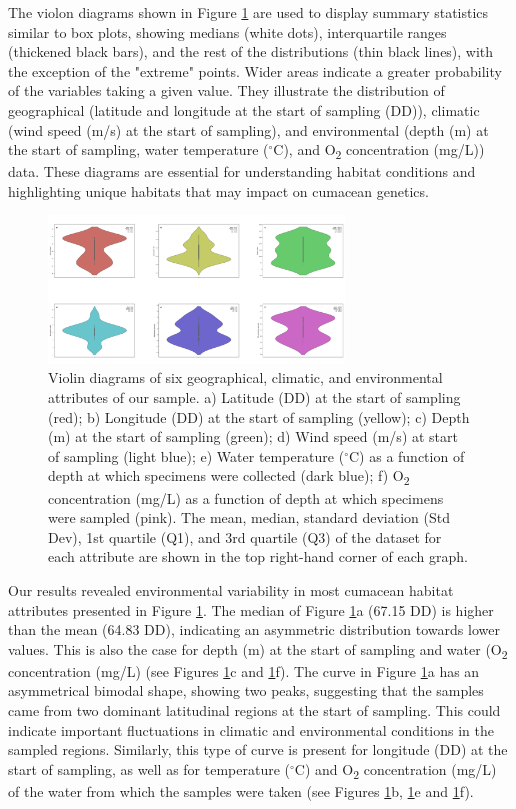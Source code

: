 The violon diagrams shown in Figure \ref{fig:fig2} are used to display summary statistics similar to box plots, showing medians (white dots), interquartile ranges (thickened black bars), and the rest of the distributions (thin black lines), with the exception of the "extreme" points. Wider areas indicate a greater probability of the variables taking a given value. They illustrate the distribution of geographical (latitude and longitude at the start of sampling (DD)), climatic (wind speed (m/s) at the start of sampling), and environmental (depth (m) at the start of sampling, water temperature ($^\circ$C), and O\textsubscript{2} concentration (mg/L)) data. These diagrams are essential for understanding habitat conditions and highlighting unique habitats that may impact on cumacean genetics. 

\begin{figure}[htbp]
    \centering
    \includegraphics[width=0.7\textwidth]{figure1.jpg}
    \caption{Violin diagrams of six geographical, climatic, and environmental attributes of our sample. a) Latitude (DD) at the start of sampling (red); b) Longitude (DD) at the start of sampling (yellow); c) Depth (m) at the start of sampling (green); d) Wind speed (m/s) at start of sampling (light blue); e) Water temperature ($^\circ$C) as a function of depth at which specimens were collected (dark blue); f) O\textsubscript{2} concentration (mg/L) as a function of depth at which specimens were sampled (pink). The mean, median, standard deviation (Std Dev), 1st quartile (Q1), and 3rd quartile (Q3) of the dataset for each attribute are shown in the top right-hand corner of each graph. \label{fig:fig2}}
\end{figure}

Our results revealed environmental variability in most cumacean habitat attributes presented in Figure \ref{fig:fig2}. The median of Figure \ref{fig:fig2}a (67.15 DD) is higher than the mean (64.83 DD), indicating an asymmetric distribution towards lower values. This is also the case for depth (m) at the start of sampling and water (O\textsubscript{2} concentration (mg/L) (see Figures \ref{fig:fig2}c and \ref{fig:fig2}f). The curve in Figure \ref{fig:fig2}a has an asymmetrical bimodal shape, showing two peaks, suggesting that the samples came from two dominant latitudinal regions at the start of sampling. This could indicate important fluctuations in climatic and environmental conditions in the sampled regions. Similarly, this type of curve is present for longitude (DD) at the start of sampling, as well as for temperature ($^\circ$C) and O\textsubscript{2} concentration (mg/L) of the water from which the samples were taken (see Figures \ref{fig:fig2}b, \ref{fig:fig2}e and \ref{fig:fig2}f). 

